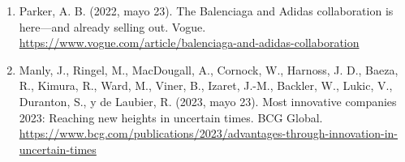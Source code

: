 \documentclass[a4paper,12pt]{article}
\begin{document}
\begin{enumerate}
	\item Parker, A. B. (2022, mayo 23). The Balenciaga and Adidas collaboration is here—and already selling out. Vogue. \url{https://www.vogue.com/article/balenciaga-and-adidas-collaboration}
	\item Manly, J., Ringel, M., MacDougall, A., Cornock, W., Harnoss, J. D., Baeza, R., Kimura, R., Ward, M., Viner, B., Izaret, J.-M., Backler, W., Lukic, V., Duranton, S., y de Laubier, R. (2023, mayo 23). Most innovative companies 2023: Reaching new heights in uncertain times. BCG Global. \url{https://www.bcg.com/publications/2023/advantages-through-innovation-in-uncertain-times}


\end{enumerate}
\end{document}
